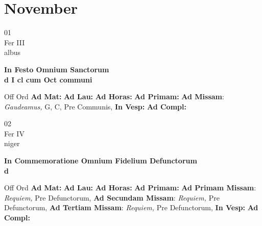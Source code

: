 \documentclass[10pt, openany]{book}
\begin{document}
    \chapter{November}
                    
    \begin{center}
        \begin{minipage}{3.5in}
            \vspace{2em}
            \begin{minipage}{0.5in}
                {\Huge 01} \\
                {\normalsize Fer III} \\
                {\normalsize albus}
            \end{minipage}
            \begin{minipage}{3.0in}
                \textbf{ \large In Festo Omnium Sanctorum \\
                \textnormal{\normalsize d I cl cum Oct communi}} \\ 
            \end{minipage}
            \begin{justify}Off Ord
                \textbf{Ad Mat: }
                \textbf{Ad Lau: }
                \textbf{Ad Horas: }
                \textbf{Ad Primam: }\textbf{Ad Missam}: \textit{Gaudeamus,} G, C, Pre Communis,  
                \textbf{In Vesp: }
                \textbf{Ad Compl: }
            \end{justify}
        \end{minipage}
    \end{center}

    \begin{center}
        \begin{minipage}{3.5in}
            \vspace{2em}
            \begin{minipage}{0.5in}
                {\Huge 02} \\
                {\normalsize Fer IV} \\
                {\normalsize niger}
            \end{minipage}
            \begin{minipage}{3.0in}
                \textbf{ \large In Commemoratione Omnium Fidelium Defunctorum \\
                \textnormal{\normalsize d}} \\ 
            \end{minipage}
            \begin{justify}Off Ord
                \textbf{Ad Mat: }
                \textbf{Ad Lau: }
                \textbf{Ad Horas: }
                \textbf{Ad Primam: }\textbf{Ad Primam Missam}: \textit{Requiem,} Pre Defunctorum,  \textbf{Ad Secundam Missam}: \textit{Requiem,} Pre Defunctorum,  \textbf{Ad Tertiam Missam}: \textit{Requiem,} Pre Defunctorum,  
                \textbf{In Vesp: }
                \textbf{Ad Compl: }
            \end{justify}
        \end{minipage}
    \end{center}
\end{document}
